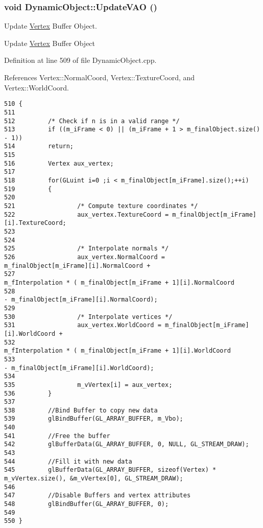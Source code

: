 \hypertarget{class_dynamic_object_cc2b12c7d159ced09674c2146cde899b}{
\subsubsection[UpdateVAO]{\setlength{\rightskip}{0pt plus 5cm}void DynamicObject::UpdateVAO ()}}
\label{class_dynamic_object_cc2b12c7d159ced09674c2146cde899b}


Update \hyperlink{class_vertex}{Vertex} Buffer Object. 

Update \hyperlink{class_vertex}{Vertex} Buffer Object 

Definition at line 509 of file DynamicObject.cpp.

References Vertex::NormalCoord, Vertex::TextureCoord, and Vertex::WorldCoord.

\begin{Code}\begin{verbatim}510 {
511         
512         /* Check if n is in a valid range */
513         if ((m_iFrame < 0) || (m_iFrame + 1 > m_finalObject.size() - 1))
514         return;
515         
516         Vertex aux_vertex;
517 
518         for(GLuint i=0 ;i < m_finalObject[m_iFrame].size();++i)
519         {
520                 
521                 /* Compute texture coordinates */
522                 aux_vertex.TextureCoord = m_finalObject[m_iFrame][i].TextureCoord;
523 
524                         
525                 /* Interpolate normals */
526                 aux_vertex.NormalCoord =        m_finalObject[m_iFrame][i].NormalCoord + 
527                                                                         m_fInterpolation * ( m_finalObject[m_iFrame + 1][i].NormalCoord
528                                                                                                                 - m_finalObject[m_iFrame][i].NormalCoord);
529 
530                 /* Interpolate vertices */
531                 aux_vertex.WorldCoord = m_finalObject[m_iFrame][i].WorldCoord + 
532                                                                 m_fInterpolation * ( m_finalObject[m_iFrame + 1][i].WorldCoord
533                                                                                                                 - m_finalObject[m_iFrame][i].WorldCoord);
534 
535                 m_vVertex[i] = aux_vertex;
536         }
537 
538         //Bind Buffer to copy new data
539         glBindBuffer(GL_ARRAY_BUFFER, m_Vbo);
540  
541         //Free the buffer
542         glBufferData(GL_ARRAY_BUFFER, 0, NULL, GL_STREAM_DRAW);
543 
544         //Fill it with new data
545         glBufferData(GL_ARRAY_BUFFER, sizeof(Vertex) * m_vVertex.size(), &m_vVertex[0], GL_STREAM_DRAW);
546 
547         //Disable Buffers and vertex attributes
548         glBindBuffer(GL_ARRAY_BUFFER, 0);
549 
550 }
\end{verbatim}
\end{Code}


